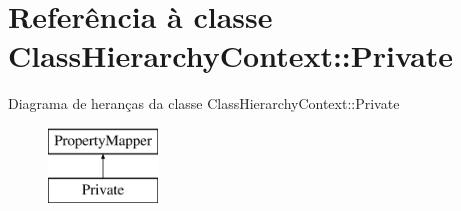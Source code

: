 \hypertarget{class_class_hierarchy_context_1_1_private}{\section{Referência à classe Class\-Hierarchy\-Context\-:\-:Private}
\label{class_class_hierarchy_context_1_1_private}
}
Diagrama de heranças da classe Class\-Hierarchy\-Context\-:\-:Private\begin{figure}[H]
\begin{center}
\leavevmode
\includegraphics[height=2.000000cm]{class_class_hierarchy_context_1_1_private}
\end{center}
\end{figure}
